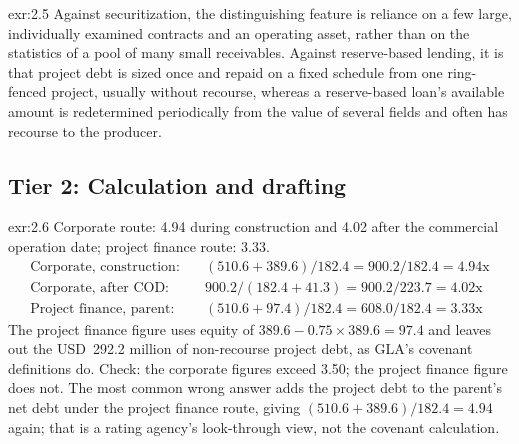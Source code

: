 \begin{solution}{exr:2.5}
Against securitization, the distinguishing feature is reliance on a few large, individually examined contracts and an operating asset, rather than on the statistics of a pool of many small receivables. Against reserve-based lending, it is that project debt is sized once and repaid on a fixed schedule from one ring-fenced project, usually without recourse, whereas a reserve-based loan's available amount is redetermined periodically from the value of several fields and often has recourse to the producer.
\end{solution}

\subsection*{Tier 2: Calculation and drafting}

\begin{solution}{exr:2.6}
Corporate route: 4.94\x{} during construction and 4.02\x{} after the commercial operation date; project finance route: 3.33\x.
\begin{align*}
\text{Corporate, construction:}\quad & (510.6 + 389.6)/182.4 = 900.2/182.4 = 4.94\text{x}\\
\text{Corporate, after COD:}\quad & 900.2/(182.4 + 41.3) = 900.2/223.7 = 4.02\text{x}\\
\text{Project finance, parent:}\quad & (510.6 + 97.4)/182.4 = 608.0/182.4 = 3.33\text{x}
\end{align*}
The project finance figure uses equity of $389.6 - 0.75 \times 389.6 = 97.4$ and leaves out the USD~292.2 million of non-recourse project debt, as GLA's covenant definitions do. Check: the corporate figures exceed 3.50\x; the project finance figure does not. The most common wrong answer adds the project debt to the parent's net debt under the project finance route, giving $(510.6 + 389.6)/182.4 = 4.94$\x{} again; that is a rating agency's look-through view, not the covenant calculation.
\end{solution}

